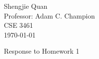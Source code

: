 \documentclass[12pt]{article}
\title{}
\author{}
\date{}                                           %
\begin{document}
\begin{flushleft}
Shengjie Quan\\
Professor: Adam C. Champion\\
CSE 3461	 \\
\today \\
\end{flushleft}

\begin{center}
Response to Homework 1
\end{center}

\setlength{\parindent}{0.5in}

\begin{singlespace}

\begin{enumerate}


\end{enumerate}
\end{singlespace}
\end{document}
